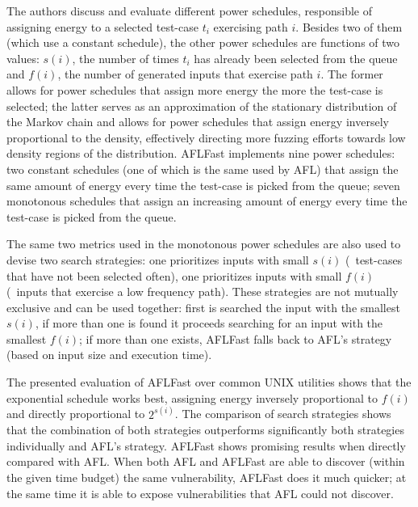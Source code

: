 The authors discuss and evaluate different power schedules, responsible of
assigning energy to a selected test-case $t_i$ exercising path $i$. Besides two
of them (which use a constant schedule), the other power schedules are functions
of two values: $s(i)$, the number of times $t_i$ has already been selected from
the queue and $f(i)$, the number of generated inputs that exercise path $i$. The
former allows for power schedules that assign more energy the more the test-case
is selected; the latter serves as an approximation of the stationary
distribution of the Markov chain and allows for power schedules that assign
energy inversely proportional to the density, effectively directing more fuzzing
efforts towards low density regions of the distribution. AFLFast implements nine
power schedules: two constant schedules (one of which is the same used by AFL)
that assign the same amount of energy every time the test-case is picked from
the queue; seven monotonous schedules that assign an increasing amount of energy
every time the test-case is picked from the queue.

The same two metrics used in the monotonous power schedules are also used to
devise two search strategies: one prioritizes inputs with small $s(i)$
(\ie~test-cases that have not been selected often), one prioritizes inputs with
small $f(i)$ (\ie~inputs that exercise a low frequency path). These strategies
are not mutually exclusive and can be used together: first is searched the input
with the smallest $s(i)$, if more than one is found it proceeds searching for an
input with the smallest $f(i)$; if more than one exists, AFLFast falls back to
AFL's strategy (based on input size and execution time).

The presented evaluation of AFLFast over common UNIX utilities shows that the
exponential schedule works best, assigning energy inversely proportional to
$f(i)$ and directly proportional to $2^{s(i)}$. The comparison of search
strategies shows that the combination of both strategies outperforms
significantly both strategies individually and AFL's strategy. AFLFast shows
promising results when directly compared with AFL\@. When both AFL and AFLFast
are able to discover (within the given time budget) the same vulnerability,
AFLFast does it much quicker; at the same time it is able to expose
vulnerabilities that AFL could not discover.

